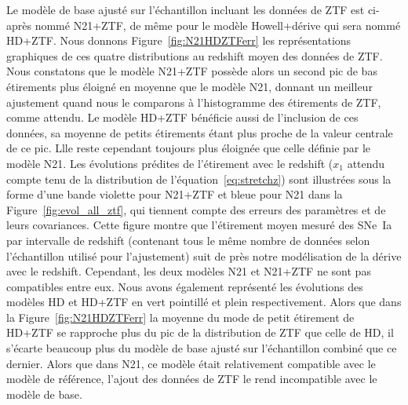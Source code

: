 \documentclass[../main/main.tex]{subfiles}
\begin{document}
Le modèle de base ajusté sur l'échantillon incluant les données de ZTF est
ci-après nommé N21+ZTF, de même pour le modèle Howell+dérive qui sera nommé
HD+ZTF. Nous donnons Figure~\ref{fig:N21HDZTFerr} les représentations graphiques
de ces quatre distributions au redshift moyen des données de ZTF. Nous
constatons que le modèle N21+ZTF possède alors un second pic de bas étirements
plus éloigné en moyenne que le modèle N21, donnant un meilleur ajustement quand
nous le comparons à l'histogramme des étirements de ZTF, comme attendu. Le modèle
HD+ZTF bénéficie aussi de l'inclusion de ces données, sa moyenne de petits
étirements étant plus proche de la valeur centrale de ce pic. Llle reste
cependant toujours plus éloignée que celle définie par le modèle N21. Les
évolutions prédites de l'étirement avec le redshift ($x_1$ attendu compte tenu
de la distribution de l'équation~\ref{eq:stretchz}) sont illustrées sous la
forme d'une bande violette pour N21+ZTF et bleue pour N21 dans la
Figure~\ref{fig:evol_all_ztf}, qui tiennent compte des erreurs des paramètres et
de leurs covariances. Cette figure montre que l'étirement moyen mesuré des
SNe~Ia par intervalle de redshift (contenant tous le même nombre de données
selon l'échantillon utilisé pour l'ajustement) suit de près notre modélisation
de la dérive avec le redshift. Cependant, les deux modèles N21 et N21+ZTF ne
sont pas compatibles entre eux. Nous avons également représenté les évolutions
des modèles HD et HD+ZTF en vert pointillé et plein respectivement. Alors que
dans la Figure~\ref{fig:N21HDZTFerr} la moyenne du mode de petit étirement de
HD+ZTF se rapproche plus du pic de la distribution de ZTF que celle de HD, il
s'écarte beaucoup plus du modèle de base ajusté sur l'échantillon combiné que ce
dernier. Alors que dans N21, ce modèle était relativement compatible avec le
modèle de référence, l'ajout des données de ZTF le rend incompatible avec le
modèle de base. 
\end{document}
